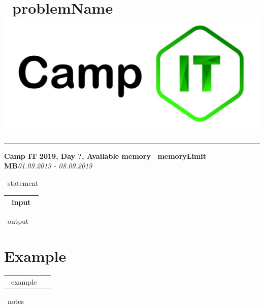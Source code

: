 \documentclass{article}
\let\OldIncludegraphics\includegraphics
\renewcommand{\includegraphics}[2][]{\OldIncludegraphics[scale=0.55, #1]{#2}}
\def \problemName           {~problemName~}
\def \memoryLimit           {~memoryLimit~ MB}
\def \day                   {?}
\begin{document}
\section*{\LARGE{\selectfont \problemName}\hfill\includegraphics[scale=1.8181]{logo}}%

\hrule
\vspace{5pt}

\textbf{Camp IT 2019, Day \day, Available memory \memoryLimit}\hfill\textit{01.09.2019 - 08.09.2019}\newline

\setlength{\parindent}{0pt}
\setlength{\parskip}{0.4\baselineskip}

\begin{sloppypar}

~statement~

\begin{center}
	\begin{tabular}{|p{10cm}|}
	\hline
~input~
	\\ \hline
	\end{tabular}
\end{center}

~output~

\section{Example}

\begin{tabularx}{\textwidth}{*{2}{|>{\ttfamily}X}|}
    \hline
    &
    \\ \hline
~example~
\end{tabularx}

~notes~

\end{sloppypar}
\end{document}
